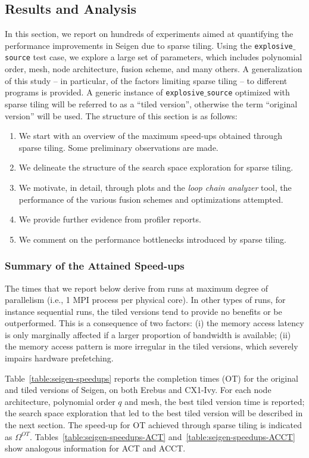 \subsection{Results and Analysis}
\label{sec:tiling:seigen-results}
In this section, we report on hundreds of experiments aimed at quantifying the performance improvements in Seigen due to sparse tiling. Using the {\tt explosive$\_$source} test case, we explore a large set of parameters, which includes polynomial order, mesh, node architecture, fusion scheme, and many others. A generalization of this study -- in particular, of the factors limiting sparse tiling -- to different programs is provided. A generic instance of {\tt explosive$\_$source} optimized with sparse tiling will be referred to as a ``tiled version'', otherwise the term ``original version'' will be used. The structure of this section is as follows:

\begin{enumerate}
\item We start with an overview of the maximum speed-ups obtained through sparse tiling. Some preliminary observations are made.
\item We delineate the structure of the search space exploration for sparse tiling. 
\item We motivate, in detail, through plots and the {\it loop chain analyzer} tool, the performance of the various fusion schemes and optimizations attempted.
\item We provide further evidence from profiler reports.
\item We comment on the performance bottlenecks introduced by sparse tiling.
\end{enumerate}

\subsubsection{Summary of the Attained Speed-ups}
The times that we report below derive from runs at maximum degree of parallelism (i.e., 1 MPI process per physical core). In other types of runs, for instance sequential runs, the tiled versions tend to provide no benefits or be outperformed. This is a consequence of two factors: (i) the memory access latency is only marginally affected if a larger proportion of bandwidth is available; (ii) the memory access pattern is more irregular in the tiled versions, which severely impairs hardware prefetching. 

Table~\ref{table:seigen-speedups} reports the completion times (OT) for the original and tiled versions of Seigen, on both Erebus and CX1-Ivy. For each node architecture, polynomial order $q$ and mesh, the best tiled version time is reported; the search space exploration that led to the best tiled version will be described in the next section. The speed-up for OT achieved through sparse tiling is indicated as $\Omega^{OT}$. Tables~\ref{table:seigen-speedups-ACT} and~\ref{table:seigen-speedups-ACCT} show analogous information for ACT and ACCT.

